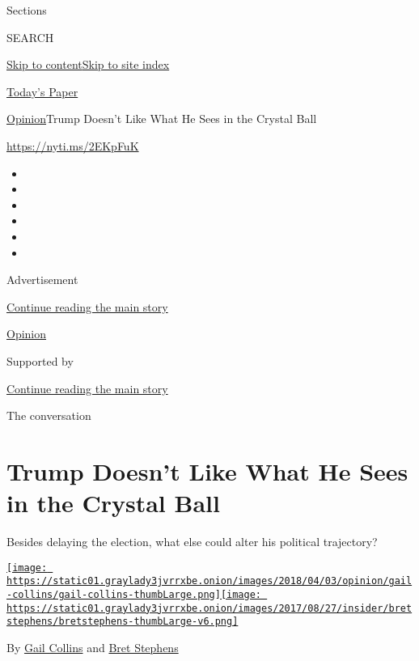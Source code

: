 Sections

SEARCH

\protect\hyperlink{site-content}{Skip to
content}\protect\hyperlink{site-index}{Skip to site index}

\href{https://myaccount.nytimes3xbfgragh.onion/auth/login?response_type=cookie\&client_id=vi}{}

\href{https://www.nytimes3xbfgragh.onion/section/todayspaper}{Today's
Paper}

\href{/section/opinion}{Opinion}\textbar{}Trump Doesn't Like What He
Sees in the Crystal Ball

\href{https://nyti.ms/2EKpFuK}{https://nyti.ms/2EKpFuK}

\begin{itemize}
\item
\item
\item
\item
\item
\item
\end{itemize}

Advertisement

\protect\hyperlink{after-top}{Continue reading the main story}

\href{/section/opinion}{Opinion}

Supported by

\protect\hyperlink{after-sponsor}{Continue reading the main story}

The conversation

\hypertarget{trump-doesnt-like-what-he-sees-in-the-crystal-ball}{%
\section{Trump Doesn't Like What He Sees in the Crystal
Ball}\label{trump-doesnt-like-what-he-sees-in-the-crystal-ball}}

Besides delaying the election, what else could alter his political
trajectory?

\href{https://www.nytimes3xbfgragh.onion/by/gail-collins}{\texttt{[image: https://static01.graylady3jvrrxbe.onion/images/2018/04/03/opinion/gail-collins/gail-collins-thumbLarge.png]}}\href{https://www.nytimes3xbfgragh.onion/by/bret-stephens}{\texttt{[image: https://static01.graylady3jvrrxbe.onion/images/2017/08/27/insider/bretstephens/bretstephens-thumbLarge-v6.png]}}

By \href{https://www.nytimes3xbfgragh.onion/by/gail-collins}{Gail
Collins} and
\href{https://www.nytimes3xbfgragh.onion/by/bret-stephens}{Bret
Stephens}

